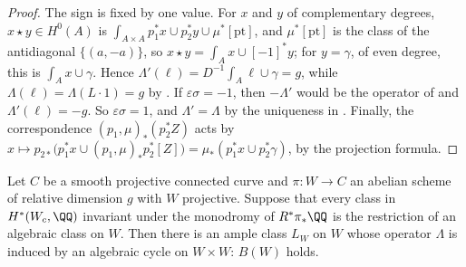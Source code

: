 \begin{proof}
The sign is fixed by one value. For $x$ and $y$ of complementary degrees,
$x\star y\in H^{0}(A)$ is $\int_{A\times A}p_{1}^{*}x\cup p_{2}^{*}y\cup
\mu^{*}[\mathrm{pt}]$, and $\mu^{*}[\mathrm{pt}]$ is the class of the
antidiagonal $\{(a,-a)\}$, so $x\star y=\int_{A}x\cup[-1]^{*}y$; for
$y=\gamma$, of even degree, this is $\int_{A}x\cup\gamma$. Hence
$\Lambda'(\ell)=D^{-1}\int_{A}\ell\cup\gamma=g$, while
$\Lambda(\ell)=\Lambda(L\cdot1)=g$ by . If
$\varepsilon\sigma=-1$, then $-\Lambda'$ would be the operator of
 and $\Lambda'(\ell)=-g$. So $\varepsilon\sigma=1$, and
$\Lambda'=\Lambda$ by the uniqueness in . Finally, the
correspondence $(p_{1},\mu)_{*}(p_{2}^{*}Z)$ acts by
$x\mapsto p_{2*}\bigl(p_{1}^{*}x\cup(p_{1},\mu)_{*}p_{2}^{*}[Z]\bigr)
=\mu_{*}(p_{1}^{*}x\cup p_{2}^{*}\gamma)$, by the projection formula.
\end{proof}

\begin{theorem}
\label{thm:lefschetzfamily}
Let $C$ be a smooth projective connected curve and $\pi\colon W\to C$ an
abelian scheme of relative dimension $g$ with $W$ projective. Suppose that
every class in $H^{*}(W_{c},\QQ)$ invariant under the monodromy of
$R^{*}\pi_{*}\QQ$ is the restriction of an algebraic class on $W$. Then there
is an ample class $L_{W}$ on $W$ whose operator $\Lambda$ is induced by an
algebraic cycle on $W\times W$: $B(W)$ holds.
\end{theorem}

